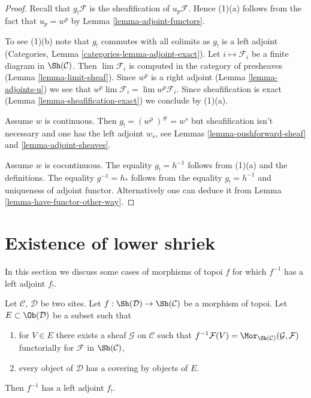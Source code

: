 \begin{proof}
Recall that $g_!\mathcal{F}$ is the sheafification of $u_p\mathcal{F}$.
Hence (1)(a) follows from the fact that $u_p = w^p$ by
Lemma \ref{lemma-adjoint-functors}.

\medskip\noindent
To see (1)(b) note that $g_!$ commutes with all colimits as $g_!$
is a left adjoint (Categories, Lemma \ref{categories-lemma-adjoint-exact}).
Let $i \mapsto \mathcal{F}_i$ be a finite diagram in $\Sh(\mathcal{C})$.
Then $\lim \mathcal{F}_i$ is computed in the category of presheaves
(Lemma \ref{lemma-limit-sheaf}). Since $w^p$ is a right adjoint
(Lemma \ref{lemma-adjoints-u})
we see that $w^p \lim \mathcal{F}_i = \lim w^p\mathcal{F}_i$. Since
sheafification is exact
(Lemma \ref{lemma-sheafification-exact})
we conclude by (1)(a).

\medskip\noindent
Assume $w$ is continuous. Then $g_! = (w^p\ )^\# = w^s$ but sheafification
isn't necessary and one has the left adjoint $w_s$, see
Lemmas \ref{lemma-pushforward-sheaf} and \ref{lemma-adjoint-sheaves}.

\medskip\noindent
Assume $w$ is cocontinuous. The equality $g_! = h^{-1}$ follows from (1)(a)
and the definitions. The equality $g^{-1} = h_*$ follows from the equality
$g_! = h^{-1}$ and uniqueness of adjoint functor. Alternatively one can deduce
it from Lemma \ref{lemma-have-functor-other-way}.
\end{proof}









\section{Existence of lower shriek}
\label{section-lower-shriek}

\noindent
In this section we discuss some cases of morphisms of topoi $f$ for which
$f^{-1}$ has a left adjoint $f_!$.

\begin{lemma}
\label{lemma-existence-lower-shriek}
Let $\mathcal{C}$, $\mathcal{D}$ be two sites.
Let $f : \Sh(\mathcal{D}) \to \Sh(\mathcal{C})$ be a morphism of topoi.
Let $E \subset \Ob(\mathcal{D})$ be a subset such that
\begin{enumerate}
\item for $V \in E$ there exists a sheaf $\mathcal{G}$
on $\mathcal{C}$ such that $f^{-1}\mathcal{F}(V) = 
\Mor_{\Sh(\mathcal{C})}(\mathcal{G}, \mathcal{F})$ functorially
for $\mathcal{F}$ in $\Sh(\mathcal{C})$,
\item every object of $\mathcal{D}$ has a covering by objects of $E$.
\end{enumerate}
Then $f^{-1}$ has a left adjoint $f_!$.
\end{lemma}

